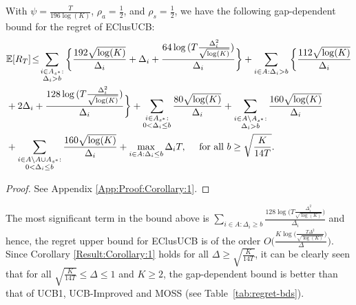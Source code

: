 \begin{corollary}
\label{Result:Corollary:1}
With $\psi=\frac{T}{196\log (K)}$, $\rho_{a}=\frac{1}{2}$, and $\rho_{s}=\frac{1}{2}$,  we have the following gap-dependent bound for the regret of EClusUCB:
\begin{align*}
&\mathbb{E} [R_T] \!\le\! 
\sum_{\substack{i\in A_{s^{*}}:\\\Delta_{i} > b}}\bigg\lbrace \frac{192\sqrt{\log (K)}}{\Delta_{i}} + \Delta_{i} + 
 \frac{64\log{(T\frac{\Delta_{i}^{2}}{\sqrt{\log (K)}})}}{\Delta_{i}} \bigg\rbrace + \sum_{i\in A:\Delta_{i} > b}\bigg\lbrace\frac{112\sqrt{\log (K)}}{\Delta_{i}} \\
 & + 2\Delta_{i}  + \frac{128\log{(T\frac{\Delta_{i}^{2}}{\sqrt{\log (K)}})}}{\Delta_{i}}\bigg\rbrace
	  + \sum\limits_{\substack{i\in A_{s^{*}}:\\0< \Delta_{i} \leq b}}\frac{80\sqrt{\log (K)}}{\Delta_{i}}
	 + \sum\limits_{\substack{i\in A\setminus A_{s^{*}}:\\\Delta_{i} > b}}\frac{160\sqrt{\log (K)}}{\Delta_{i}} \\
	 & + \sum\limits_{\substack{i\in A\setminus A \cup A_{s^{*}}:\\0 < \Delta_{i}\leq b}}\frac{160\sqrt{\log (K)}}{\Delta_{i}}  + \max\limits_{i\in A:\Delta_{i}\leq b}\Delta_{i}T, \quad \text{ for all }b\geq \sqrt{\frac{K}{14 T}}.
	\end{align*} 
\end{corollary}
\begin{proof}
 See Appendix \ref{App:Proof:Corollary:1}.
\end{proof}

The most significant term in the bound above is $\sum_{i\in A:\Delta_{i}\geq b}\frac{128\log{\big(T\frac{\Delta_{i}^{2}}{\sqrt{\log (K)}}\big)}}{\Delta_{i}}$ and hence, the regret upper bound for EClusUCB is of the order $O\bigg(\frac{K\log \big(\frac{T\Delta^{2}}{\sqrt{\log (K)}}\big)}{\Delta}\bigg)$. Since Corollary \ref{Result:Corollary:1} holds for all $\Delta \geq \sqrt{\frac{K}{14 T}} $, it can be clearly seen that for all $\sqrt{\frac{K}{14 T}} \leq \Delta\leq 1$ and $K\geq 2$, the gap-dependent bound is better than that of UCB1, UCB-Improved and MOSS (see Table~\ref{tab:regret-bds}). 





